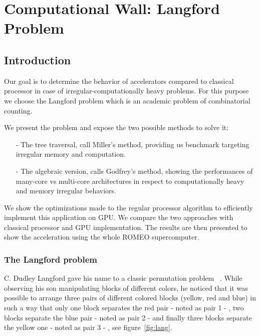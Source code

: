 
\chapter{Computational Wall: Langford Problem}

\section{Introduction}
Our goal is to determine the behavior of accelerators compared to classical processor in case of irregular-computationally heavy problems.
For this purpose we choose the Langford problem which is an academic problem of combinatorial counting.

We present the problem and expose the two possible methods to solve it:
\begin{itemize}[noitemsep,nolistsep]
\item[-] The tree traversal, call Miller's method, providing us benchmark targeting irregular memory and computation. 
\item[-]The algebraic version, calls Godfrey's method, showing the performances of many-core vs multi-core architectures in respect to computationally heavy and memory irregular behaviors.  
\end{itemize}
We show the optimizations made to the regular processor algorithm to efficiently implement this application on GPU. 
We compare the two approaches with classical processor and GPU implementation. 
The results are then presented to show the acceleration using the whole ROMEO supercomputer.

\subsection{The Langford problem}

C. Dudley Langford gave his name to a classic permutation problem ~\cite{Gard56, Simp83}.  
While observing his son manipulating blocks of different colors, he noticed that it was possible to arrange three pairs of different colored blocks (yellow, red and blue) in such a way that only one block separates the red pair - noted as pair 1 - , two blocks separate the blue pair - noted as pair 2 - and finally three blocks separate the yellow one - noted as pair 3 - , see figure~\ref{fig:lang}.\\

